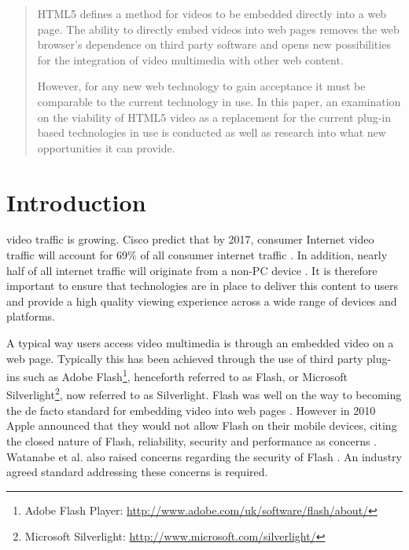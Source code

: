 \documentclass[journal]{IEEEtran}
\begin{document}







\maketitle


\begin{abstract}
HTML5 defines a method for videos to be embedded directly into a web page. The ability to directly embed videos into web pages removes the web browser's dependence on third party software and opens new possibilities for the integration of video multimedia with other web content.

However, for any new web technology to gain acceptance it must be comparable to the current technology in use. In this paper, an examination on the viability of HTML5 video as a replacement for the current plug-in based technologies in use is conducted as well as research into what new opportunities it can provide.
\end{abstract}

\IEEEpeerreviewmaketitle

\section{Introduction}
 video traffic is growing. Cisco predict that by 2017, consumer Internet video traffic will account for 69\% of all consumer internet traffic \cite{website:ciscoForecastAndMethodology}. In addition, nearly half of all internet traffic will originate from a non-PC device \cite{website:ciscoForecastAndMethodology}. It is therefore important to ensure that technologies are in place to deliver this content to users and provide a high quality viewing experience across a wide range of devices and platforms.

A typical way users access video multimedia is through an embedded video on a web page. Typically this has been achieved through the use of third party plug-ins such as Adobe Flash\footnote{Adobe Flash Player: \url{http://www.adobe.com/uk/software/flash/about/}}, henceforth referred to as Flash, or Microsoft Silverlight\footnote{Microsoft Silverlight: \url{http://www.microsoft.com/silverlight/}}, now referred to as Silverlight. Flash was well on the way to becoming the de facto standard for embedding video into web pages \cite{article:HTML5LeadsAWebRevolution}. However in 2010 Apple announced that they would not allow Flash on their mobile devices, citing the closed nature of Flash, reliability, security and performance as concerns \cite{website:appleFlash}. Watanabe et al. also raised concerns regarding the security of Flash \cite{inproceedings:flashSecurity}. An industry agreed standard addressing these concerns is required.
\end{document}
